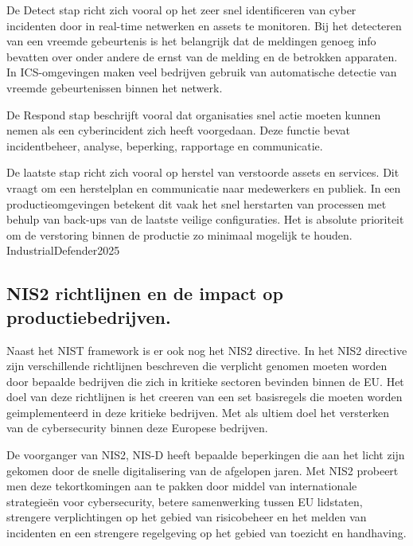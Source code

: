 \vspace{5mm}
De Detect stap richt zich vooral op het zeer snel identificeren van cyber incidenten door in real-time netwerken en assets te monitoren. Bij het detecteren van een vreemde gebeurtenis is het belangrijk dat de meldingen genoeg info bevatten over onder andere de ernst van de melding en de betrokken apparaten. In ICS-omgevingen maken veel bedrijven gebruik van automatische detectie van vreemde gebeurtenissen binnen het netwerk. \autocite{Nist2024}

\vspace{5mm}
De Respond stap beschrijft vooral dat organisaties snel actie moeten kunnen nemen als een cyberincident zich heeft voorgedaan. Deze functie bevat incidentbeheer, analyse, beperking, rapportage en communicatie. \autocite{Nist2024}

\vspace{5mm}
De laatste stap richt zich vooral op herstel van verstoorde assets en services. Dit vraagt om een herstelplan en communicatie naar medewerkers en publiek. In een productieomgevingen betekent dit vaak het snel herstarten van processen met behulp van back-ups van de laatste veilige configuraties. Het is absolute prioriteit om de verstoring binnen de productie zo minimaal mogelijk te houden. {IndustrialDefender2025}


\subsection{NIS2 richtlijnen en de impact op productiebedrijven.}
Naast het NIST framework is er ook nog het NIS2 directive. In het NIS2 directive zijn verschillende richtlijnen beschreven die verplicht genomen moeten worden door bepaalde bedrijven die zich in kritieke sectoren bevinden binnen de EU. Het doel van deze richtlijnen is het creeren van een set basisregels die moeten worden geimplementeerd in deze kritieke bedrijven. Met als ultiem doel het versterken van de cybersecurity binnen deze Europese bedrijven. \autocite{VanLeeuwen2025}

\vspace{5mm}
De voorganger van NIS2, NIS-D heeft bepaalde beperkingen die aan het licht zijn gekomen door de snelle digitalisering van de afgelopen jaren. Met NIS2 probeert men deze tekortkomingen aan te pakken door middel van internationale strategieën voor cybersecurity, betere samenwerking tussen EU lidstaten, strengere verplichtingen op het gebied van risicobeheer en het melden van incidenten en een strengere regelgeving op het gebied van toezicht en handhaving. \autocite{Ey2025}

